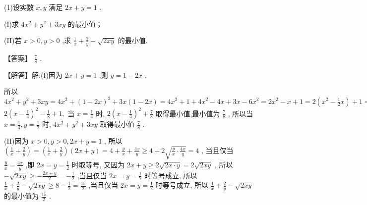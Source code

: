 \documentclass[11pt,a4paper]{article}
\begin{document}
\begin{problem} 
(1)设实数 \(\displaystyle x,y\) 满足 \(\displaystyle {2x} + y = 1\) .

(I)求 \(\displaystyle 4{x}^{2} + {y}^{2} + {3xy}\) 的最小值；

(II)若 \(\displaystyle x > 0,y > 0\) ,求 \(\displaystyle \frac{1}{x} + \frac{2}{y} - \sqrt{2xy}\) 的最小值.
\begin{jiexi}[50]
【答案】 \(\displaystyle \frac{7}{8}\) .

【解答】解:(I)因为 \(\displaystyle {2x} + y = 1\) ,则 \(\displaystyle y = 1 - {2x}\) ,

所以 \(\displaystyle 4{x}^{2} + {y}^{2} + {3xy} = 4{x}^{2} + {\left( 1 - 2x\right) }^{2} + {3x}\left( {1 - {2x}}\right)  = 4{x}^{2} + 1 + 4{x}^{2} - {4x} + {3x} - 6{x}^{2} = 2{x}^{2} - x + 1 = 2\left( {{x}^{2} - \frac{1}{2}x}\right)  + 1 =\)  \(\displaystyle 2{\left( x - \frac{1}{4}\right) }^{2} - \frac{1}{8} + 1,\) 当 \(\displaystyle x = \frac{1}{4}\) 时, \(\displaystyle 2{\left( x - \frac{1}{4}\right) }^{2} + \frac{7}{8}\) 取得最小值,最小值为 \(\displaystyle \frac{7}{8}\) , 所以当 \(\displaystyle x = \frac{1}{4},y = \frac{1}{2}\) 时, \(\displaystyle 4{x}^{2} + {y}^{2} + {3xy}\) 取得最小值 \(\displaystyle \frac{7}{8}\) . 

(II)因为 \(\displaystyle x > 0,y > 0,{2x} + y = 1\) , 所以 \(\displaystyle \left( {\frac{1}{x} + \frac{2}{y}}\right)  = \left( {\frac{1}{x} + \frac{2}{y}}\right) \left( {{2x} + y}\right)  = 4 + \frac{y}{x} + \frac{4x}{y} \geq  4 + 2\sqrt{\frac{y}{x} \cdot  \frac{4x}{y}} = 4\) , 当且仅当 \(\displaystyle \frac{y}{x} = \frac{4x}{y}\) ,即 \(\displaystyle {2x} = y = \frac{1}{2}\) 时取等号, 又因为 \(\displaystyle {2x} + y \geq  2\sqrt{{2x} \cdot  y} = 2\sqrt{2xy}\) , 所以 \(\displaystyle - \sqrt{2xy} \geq   - \frac{{2x} + y}{2} =  - \frac{1}{2}\) ,当且仅当 \(\displaystyle {2x} = y = \frac{1}{2}\) 时等号成立, 所以 \(\displaystyle \frac{1}{x} + \frac{2}{y} - \sqrt{2xy} \geq  8 - \frac{1}{2} = \frac{15}{2}\) ,当且仅当 \(\displaystyle {2x} = y = \frac{1}{2}\) 时等号成立, 所以 \(\displaystyle \frac{1}{x} + \frac{2}{y} - \sqrt{2xy}\) 的最小值为 \(\displaystyle \frac{15}{2}\) . 


\end{jiexi}
\end{problem}
\sclear
\end{document}
